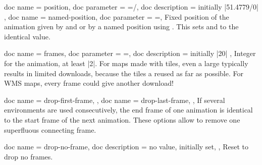 \begin{docMrcKeys}[
    doc keypath = anim,
    doc new     = 2023-07-31,
  ]{
    {
      doc name        = position,
      doc parameter   = {=/},
      doc description = initially |51.4779/0|
    },
    {
      doc name      = named-position,
      doc parameter = {=},
    }
  }
  Fixed position of the animation given by
   and  or by a named position using .
  This sets  and
   to the identical value.
\end{docMrcKeys}



\begin{docMrcKeys}[
    doc keypath = anim,
    doc new     = 2023-07-31,
  ]{
    {
      doc name        = frames,
      doc parameter   = {=},
      doc description = initially |20|
    },
  }
  Integer  for the animation, at least |2|. For maps made with tiles,
  even a large  typically results in limited downloads,
  because the tiles a reused as far as possible. For WMS maps, every frame
  could give another download!
\end{docMrcKeys}


\begin{docMrcKeys}[
    doc keypath = anim,
    doc new     = 2023-07-31,
    doc parameter   = {\colOpt{=true\textbar false}},
    doc description = {default |true|, initially |false|},
  ]{
    {
      doc name        = drop-first-frame,
    },
    {
      doc name        = drop-last-frame,
    },
  }
  If several  environments are used consecutively,
  the end frame of one animation is identical to the start frame of the
  next animation. These options allow to remove one superfluous connecting frame.
\end{docMrcKeys}


\begin{docMrcKeys}[
    doc keypath = anim,
    doc new     = 2023-07-31,
  ]{
    {
      doc name        = drop-no-frame,
      doc description = {no value, initially set},
    },
  }
  Reset to drop no frames.
\end{docMrcKeys}


